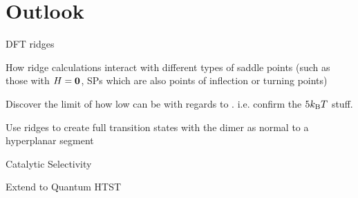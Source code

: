 \section{Outlook}
\label{sec:summary-outlook}

\bit
\item DFT ridges
\item How ridge calculations interact with different types of saddle points (such as those with $H = {\mathrm{\mathbf{\bm{0}}}}$, SPs which are also points of inflection or turning points)
\item Discover the limit of how low  can be with regards to . i.e. confirm the $5k_\text{B} T$ stuff.
\item Use ridges to create full transition states with the dimer as normal to a hyperplanar segment
\item Catalytic Selectivity
\item Extend to Quantum HTST
\eit

\placeholder
